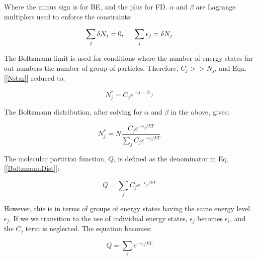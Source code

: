 \documentclass[10pt]{article}
\begin{document}
\begin{flushleft}
\begin{definition}
    Where the minus sign is for BE, and the plus for FD. $\alpha$ and $\beta$ are Lagrange multiplers used to enforce the constraints:

    \begin{equation}
        \sum_j \delta N_j = 0, \hspace{5mm} \sum_j \epsilon_j = \delta N_j
    \end{equation}    
\end{definition}

\begin{definition}
    The Boltzmann limit is used for conditions where the number of energy states far out numbers the number of group of particles. Therefore, $C_j >> N_j$, and Eqn. [\ref{Nstar}] reduced to:

    \begin{equation}
        N_j^* = C_j e^{-\alpha - \beta \epsilon_j}
    \end{equation}
\end{definition}

\begin{definition}
    The Boltzmann distribution, after solving for $\alpha$ and $\beta$ in the above, gives:

    \begin{equation}
        N_j^* = N \frac{C_j e^{-\epsilon_j / kT}}{\sum_j C_j e^{-\epsilon_j / kT}} \label{BoltzmannDist}
    \end{equation}

\end{definition}

\begin{definition}
    The molecular partition function, $Q$, is defined as the denominator in Eq. [\ref{BoltzmannDist}]:

    \begin{equation}
        Q = \sum_j C_j e^{-\epsilon_j / kT}
    \end{equation}
    
    However, this is in terms of groups of energy states having the same energy level $\epsilon_j$. If we we transition to the use of individual energy states, $\epsilon_j$ becomes $\epsilon_i$, and the $C_j$ term is neglected. The equation becomes:
    
    \begin{equation}
        Q = \sum_i e^{-\epsilon_i / kT}
    \end{equation}
\end{definition}


\end{flushleft}
\end{document}
